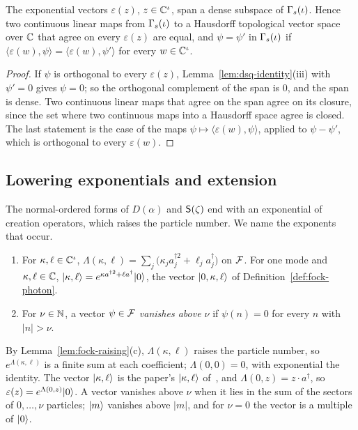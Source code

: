 \begin{veteenv}
\begin{theorem}[Totality]\label{thm:dsq-total}
The exponential vectors $\varepsilon(z)$, $z\in\mathbb C^\iota$, span a dense subspace of $\Gamma_s(\iota)$. Hence two continuous linear maps
from $\Gamma_s(\iota)$ to a Hausdorff topological vector space over $\mathbb C$ that agree on every $\varepsilon(z)$ are equal, and
$\psi=\psi'$ in $\Gamma_s(\iota)$ if $\langle\varepsilon(w),\psi\rangle=\langle\varepsilon(w),\psi'\rangle$ for every $w\in\mathbb C^\iota$.
\end{theorem}

\begin{proof}
If $\psi$ is orthogonal to every $\varepsilon(z)$, Lemma~\ref{lem:dsq-identity}(iii) with $\psi'=0$ gives $\psi=0$; so the
orthogonal complement of the span is $0$, and the span is dense. Two continuous linear maps that agree on the span agree on
its closure, since the set where two continuous maps into a Hausdorff space agree is closed. The last statement is the case
of the maps $\psi\mapsto\langle\varepsilon(w),\psi\rangle$, applied to $\psi-\psi'$, which is orthogonal to every
$\varepsilon(w)$.
\end{proof}

\subsection{Lowering exponentials and extension}\label{sec:dsq-lower}

The normal-ordered forms of $D(\alpha)$ and $\mathsf S(\zeta)$ end with an exponential of creation operators, which raises the
particle number. We name the exponents that occur.

\begin{definition}\label{def:dsq-gaussraise}
\begin{enumerate}
\item[(a)] For $\kappa,\ell\in\mathbb C^\iota$, $\Lambda(\kappa,\ell)=\sum_j\bigl(\kappa_ja_j^{\dagger2}+\ell_ja_j^\dagger\bigr)$ on
$\mathcal F$. For one mode and $\kappa,\ell\in\mathbb C$, $\lvert \kappa,\ell\rangle=e^{\kappa a^{\dagger2}+\ell a^\dagger}\lvert 0\rangle$, the vector
$\lvert 0,\kappa,\ell\rangle$ of Definition~\ref{def:fock-photon}.
\item[(b)] For $\nu\in\mathbb N$, a vector $\psi\in\mathcal F$ \emph{vanishes above $\nu$} if $\psi(n)=0$ for every $n$ with
$\lvert n\rvert>\nu$.
\end{enumerate}
\end{definition}

By Lemma~\ref{lem:fock-raising}(c), $\Lambda(\kappa,\ell)$ raises the particle number, so $e^{\Lambda(\kappa,\ell)}$ is a finite sum
at each coefficient; $\Lambda(0,0)=0$, with exponential the identity. The vector $\lvert \kappa,\ell\rangle$ is the paper's
$\lvert \kappa,\ell\rangle$ of~\cite[(8)]{tjoacirac}, and $\Lambda(0,z)=z\cdot a^\dagger$, so $\varepsilon(z)=e^{\Lambda(0,z)}\lvert 0\rangle$. A
vector vanishes above $\nu$ when it lies in the sum of the sectors of $0,\ldots,\nu$ particles; $\lvert m\rangle$ vanishes above
$\lvert m\rvert$, and for $\nu=0$ the vector is a multiple of $\lvert 0\rangle$.


\end{veteenv}
